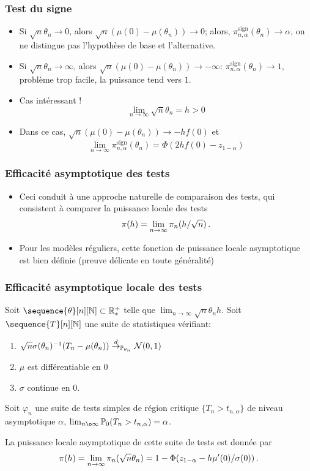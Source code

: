 \begin{frame}
\frametitle{Test du signe}
\begin{itemize}
\item Si $\sqrt{n} \theta_n \to 0$, alors $\sqrt{n}(\mu(0)- \mu(\theta_n)) \to 0$; alors, $\pi_{n,\alpha}^{\mathrm{sign}}(\theta_n) \to \alpha$,
on ne distingue pas l'hypothèse de base et l'alternative.
\item Si $\sqrt{n} \theta_n \to \infty$, alors $\sqrt{n}(\mu(0)- \mu(\theta_n)) \to -\infty$: $\pi_{n,\alpha}^{\mathrm{sign}}(\theta_n) \to 1$, problème \alert{trop facile}, la puissance tend vers $1$.
\item Cas intéressant !
\alert{
\[
\lim_{n \to \infty} \sqrt{n} \theta_n= h > 0
\]
}
\item Dans ce cas, $\sqrt{n}(\mu(0)- \mu(\theta_n)) \to -h f(0)$ et
\alert{
\[
\lim_{n \to \infty} \pi_{n,\alpha}^{\mathrm{sign}}(\theta_n) = \Phi(2 h f(0) - z_{1-\alpha})
\]
}
\end{itemize}
\end{frame}

\begin{frame}
\frametitle{Efficacité asymptotique des tests}
\begin{itemize}
\item Ceci conduit à une approche naturelle de comparaison des tests, qui consistent à comparer la \alert{puissance locale des tests}
\alert{
\[
\pi(h)= \lim_{n \to \infty} \pi_n( h / \sqrt{n}) \,.
\]
}
\item Pour les modèles réguliers, cette fonction de \alert{puissance locale asymptotique} est bien définie (preuve délicate en toute généralité)
\end{itemize}
\end{frame}

\begin{frame}
\frametitle{Efficacité asymptotique locale des tests}
\begin{theo}
Soit $\sequence{\theta}[n][\nset] \subset \rset^+_*$ telle que $\lim_{n \to \infty}\sqrt{n} \theta_n h$.
Soit $\sequence{T}[n][\nset]$ une suite de statistiques vérifiant:
\begin{enumerate}
\item $\sqrt{n} \sigma(\theta_n)^{-1} (T_n - \mu(\theta_n)) \stackrel{d}{\rightarrow}_{\operatorname{{\mathbb P}}_{\theta_n}} \mathcal{N}(0,1)$
\item $\mu$ est différentiable en $0$
\item $\sigma$ continue en $0$.
\end{enumerate}
Soit  $\varphi_n$ une suite de tests simples de région critique $\{ T_n > t_{n,\alpha}\}$  de niveau asymptotique $\alpha$, $\lim_{n \o \infty} \PP_{0}( T_n > t_{n,\alpha})= \alpha$.

\bigskip

La \alert{puissance locale asymptotique} de cette suite de tests est donnée par
\[
\pi(h)= \lim_{n \to \infty} \pi_n( \sqrt{n} \theta_n)= 1 - \Phi(z_{1-\alpha} - h \mu'(0)/\sigma(0)) \,.
\]
\end{theo}
\end{frame}

